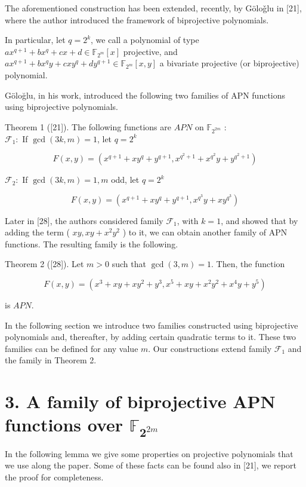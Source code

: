 \documentclass[10pt]{article}
\begin{document}
The aforementioned construction has been extended, recently, by Göloǧlu in [21], where the author introduced the framework of biprojective polynomials.

In particular, let $q=2^{k}$, we call a polynomial of type $a x^{q+1}+b x^{q}+c x+d \in \mathbb{F}_{2^{m}}[x]$ projective, and $a x^{q+1}+b x^{q} y+c x y^{q}+d y^{q+1} \in \mathbb{F}_{2^{m}}[x, y]$ a bivariate projective (or biprojective) polynomial.

Göloğlu, in his work, introduced the following two families of APN functions using biprojective polynomials.

Theorem 1 ([21]). The following functions are $A P N$ on $\mathbb{F}_{2^{2 m}}$ :\\
$\mathcal{F}_{1}:$ If $\operatorname{gcd}(3 k, m)=1$, let $q=2^{k}$

$$
F(x, y)=\left(x^{q+1}+x y^{q}+y^{q+1}, x^{q^{2}+1}+x^{q^{2}} y+y^{q^{2}+1}\right)
$$

$\mathcal{F}_{2}:$ If $\operatorname{gcd}(3 k, m)=1, m$ odd, let $q=2^{k}$

$$
F(x, y)=\left(x^{q+1}+x y^{q}+y^{q+1}, x^{q^{3}} y+x y^{q^{3}}\right)
$$

Later in [28], the authors considered family $\mathcal{F}_{1}$, with $k=1$, and showed that by adding the term ( $x y, x y+x^{2} y^{2}$ ) to it, we can obtain another family of APN functions. The resulting family is the following.

Theorem 2 ([28]). Let $m>0$ such that $\operatorname{gcd}(3, m)=1$. Then, the function

$$
F(x, y)=\left(x^{3}+x y+x y^{2}+y^{3}, x^{5}+x y+x^{2} y^{2}+x^{4} y+y^{5}\right)
$$

is $A P N$.

In the following section we introduce two families constructed using biprojective polynomials and, thereafter, by adding certain quadratic terms to it. These two families can be defined for any value $m$. Our constructions extend family $\mathcal{F}_{1}$ and the family in Theorem 2.

\section*{3. A family of biprojective APN functions over $\mathbb{F}_{\mathbf{2}^{2 m}}$}
In the following lemma we give some properties on projective polynomials that we use along the paper. Some of these facts can be found also in [21], we report the proof for completeness.
\end{document}
